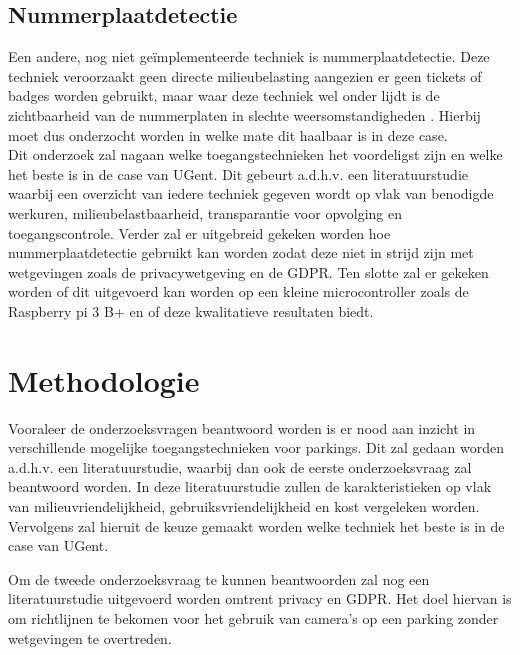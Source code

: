 \subsection{Nummerplaatdetectie}
Een andere, nog niet geïmplementeerde techniek is nummerplaatdetectie. Deze techniek veroorzaakt geen directe milieubelasting aangezien er geen tickets of badges worden gebruikt, maar waar deze techniek wel onder lijdt is de zichtbaarheid van de nummerplaten in slechte weersomstandigheden \autocite{azam2016automatic}. Hierbij moet dus onderzocht worden in welke mate dit haalbaar is in deze case.
\\
Dit onderzoek zal nagaan welke toegangstechnieken het voordeligst zijn en welke het beste is in de case van UGent. Dit gebeurt a.d.h.v. een literatuurstudie waarbij een overzicht van iedere techniek gegeven wordt op vlak van benodigde werkuren, milieubelastbaarheid, transparantie voor opvolging en toegangscontrole. Verder zal er uitgebreid gekeken worden hoe nummerplaatdetectie gebruikt kan worden zodat deze niet in strijd zijn met wetgevingen zoals de privacywetgeving en de GDPR. Ten slotte zal er gekeken worden of dit uitgevoerd kan worden op een kleine microcontroller zoals de Raspberry pi 3 B+ en of deze kwalitatieve resultaten biedt.


\section{Methodologie}
\label{sec:methodologie}

Vooraleer de onderzoeksvragen beantwoord worden is er nood aan inzicht in verschillende mogelijke toegangstechnieken voor parkings. Dit zal gedaan worden a.d.h.v. een literatuurstudie, waarbij dan ook de eerste onderzoeksvraag zal beantwoord worden. In deze literatuurstudie zullen de karakteristieken op vlak van milieuvriendelijkheid, gebruiksvriendelijkheid en kost vergeleken worden. Vervolgens zal hieruit de keuze gemaakt worden welke techniek het beste is in de case van UGent.

Om de tweede onderzoeksvraag te kunnen beantwoorden zal nog een literatuurstudie uitgevoerd worden omtrent privacy en GDPR. Het doel hiervan is om richtlijnen te bekomen voor het gebruik van camera’s op een parking zonder wetgevingen te overtreden.

